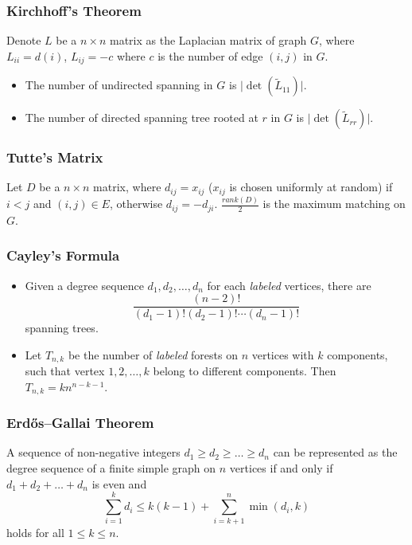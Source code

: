 
\subsubsection{Kirchhoff's Theorem}
Denote $L$ be a $n \times n$ matrix as the Laplacian matrix of graph $G$, where $L_{ii} = d(i)$, $L_{ij} = -c$ where $c$ is the number of edge $(i, j)$ in $G$.
\begin{itemize}
    \item The number of undirected spanning in $G$ is $\lvert \det(\tilde{L}_{11}) \rvert$.
    \item The number of directed spanning tree rooted at $r$ in $G$ is $\lvert \det(\tilde{L}_{rr}) \rvert$.
\end{itemize}

\subsubsection{Tutte's Matrix}
Let $D$ be a $n \times n$ matrix, where $d_{ij} = x_{ij}$ ($x_{ij}$ is chosen uniformly at random) if $i < j$ and $(i, j) \in E$, otherwise $d_{ij} = -d_{ji}$. $\frac{rank(D)}{2}$ is the maximum matching on $G$.

\subsubsection{Cayley's Formula}
\begin{itemize}
  \item Given a degree sequence $d_1, d_2, \ldots, d_n$ for each \textit{labeled} vertices, there are $$\frac{(n - 2)!}{(d_1 - 1)!(d_2 - 1)!\cdots(d_n - 1)!}$$ spanning trees.
  \item Let $T_{n, k}$ be the number of \textit{labeled} forests on $n$ vertices with $k$ components, such that vertex $1, 2, \ldots, k$ belong to different components. Then $T_{n, k} = kn^{n - k - 1}$.
\end{itemize}

\subsubsection{Erdős–Gallai Theorem}
A sequence of non-negative integers $d_1 \geq d_2 \geq \ldots \geq d_n$ can be represented as the degree sequence of a finite simple graph on $n$ vertices if and only if $d_1 + d_2 + \ldots + d_n$ is even and
$$ \sum_{i = 1}^{k}d_i \leq k(k - 1) + \sum_{i = k + 1}^{n}\min(d_i, k) $$
holds for all $1 \leq k \leq n$.

